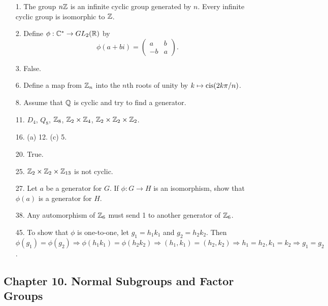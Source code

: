 {\small
\begin{itemize}
 
\item[1.] 
The group $n{\Bbb Z}$ is an infinite cyclic group generated by $n$.
Every infinite cyclic group is isomorphic to ${\Bbb Z}$.
 
 
\item[2.] 
Define $\phi: {\Bbb C}^* \rightarrow GL_2( {\Bbb R})$ by 
\[
\phi(a + bi) = 
\begin{pmatrix}
a & b \\
-b & a
\end{pmatrix}.
\]
 
 
\item[3.]
False.
 
\item[6.]
Define a map from ${\Bbb Z}_n$ into the $n$th roots of unity by $k
\mapsto \operatorname{cis}(2k\pi / n)$.
 
\item[8.]
Assume that ${\Bbb Q}$ is cyclic and try to find a generator.
 
 
\item[11.]
$D_4$, $Q_8$, ${\Bbb Z}_8$, ${\Bbb Z}_2 \times {\Bbb Z}_4$,
${\Bbb Z}_2 \times {\Bbb Z}_2 \times {\Bbb Z}_2$.
 
\item[16.]
(a) 12.
(c) 5.
 
 
\item[20.]
True.
 
 
\item[25.]
${\Bbb Z}_2 \times {\Bbb Z}_2 \times {\Bbb Z}_{13}$ is not cyclic. 
 
\item[27.]
Let $a$ be a generator for $G$. If $\phi :G \rightarrow H$ is an
isomorphism, show that $\phi(a)$ is a generator for $H$.
 
\item[38.]
Any automorphism of ${\Bbb Z}_6$ must send 1 to another generator of
${\Bbb Z}_6$.
 
 
\item[45.]
To show that $\phi$ is one-to-one, let $g_1 = h_1 k_1$ and $g_2 = h_2
k_2$. Then $\phi(g_1) = \phi(g_2) \Rightarrow \phi(h_1 k_1) = \phi(h_2
k_2) \Rightarrow (h_1, k_1) = (h_2, k_2) \Rightarrow h_1 = h_2, k_1 =
k_2 \Rightarrow g_1 = g_2$. 
 
 
 
 
\end{itemize}
}
 
\subsection*{Chapter 10. Normal Subgroups and Factor Groups}
 
